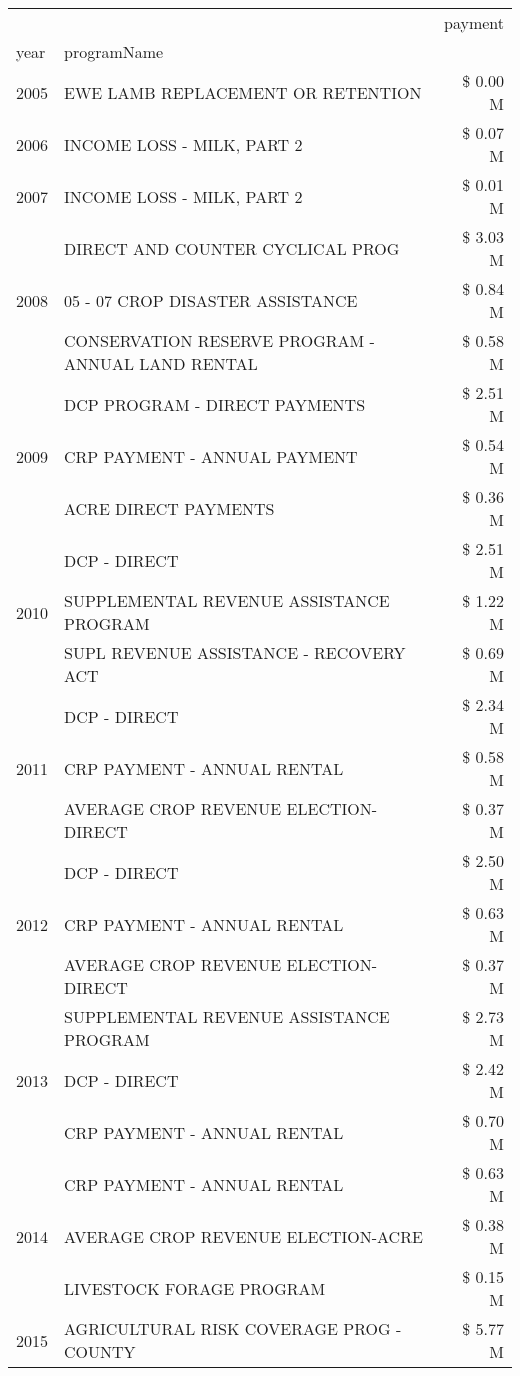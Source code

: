 \begin{tabular}{llr}
\toprule
 &  & payment \\
year & programName &  \\
\midrule
2005 & EWE LAMB REPLACEMENT OR RETENTION & \$ 0.00 M \\
\cline{1-3}
2006 & INCOME LOSS - MILK, PART 2 & \$ 0.07 M \\
\cline{1-3}
2007 & INCOME LOSS - MILK, PART 2 & \$ 0.01 M \\
\cline{1-3}
\multirow[t]{3}{*}{2008} & DIRECT AND COUNTER CYCLICAL PROG & \$ 3.03 M \\
 & 05 - 07 CROP DISASTER ASSISTANCE & \$ 0.84 M \\
 & CONSERVATION RESERVE PROGRAM - ANNUAL LAND RENTAL & \$ 0.58 M \\
\cline{1-3}
\multirow[t]{3}{*}{2009} & DCP PROGRAM - DIRECT PAYMENTS & \$ 2.51 M \\
 & CRP PAYMENT - ANNUAL PAYMENT & \$ 0.54 M \\
 & ACRE DIRECT PAYMENTS & \$ 0.36 M \\
\cline{1-3}
\multirow[t]{3}{*}{2010} & DCP - DIRECT & \$ 2.51 M \\
 & SUPPLEMENTAL REVENUE ASSISTANCE PROGRAM & \$ 1.22 M \\
 & SUPL REVENUE ASSISTANCE - RECOVERY ACT & \$ 0.69 M \\
\cline{1-3}
\multirow[t]{3}{*}{2011} & DCP - DIRECT & \$ 2.34 M \\
 & CRP PAYMENT - ANNUAL RENTAL & \$ 0.58 M \\
 & AVERAGE CROP REVENUE ELECTION-DIRECT & \$ 0.37 M \\
\cline{1-3}
\multirow[t]{3}{*}{2012} & DCP - DIRECT & \$ 2.50 M \\
 & CRP PAYMENT - ANNUAL RENTAL & \$ 0.63 M \\
 & AVERAGE CROP REVENUE ELECTION-DIRECT & \$ 0.37 M \\
\cline{1-3}
\multirow[t]{3}{*}{2013} & SUPPLEMENTAL REVENUE ASSISTANCE PROGRAM & \$ 2.73 M \\
 & DCP - DIRECT & \$ 2.42 M \\
 & CRP PAYMENT - ANNUAL RENTAL & \$ 0.70 M \\
\cline{1-3}
\multirow[t]{3}{*}{2014} & CRP PAYMENT - ANNUAL RENTAL & \$ 0.63 M \\
 & AVERAGE CROP REVENUE ELECTION-ACRE & \$ 0.38 M \\
 & LIVESTOCK FORAGE PROGRAM & \$ 0.15 M \\
\cline{1-3}
\multirow[t]{3}{*}{2015} & AGRICULTURAL RISK COVERAGE PROG - COUNTY & \$ 5.77 M \\

\end{tabular}
